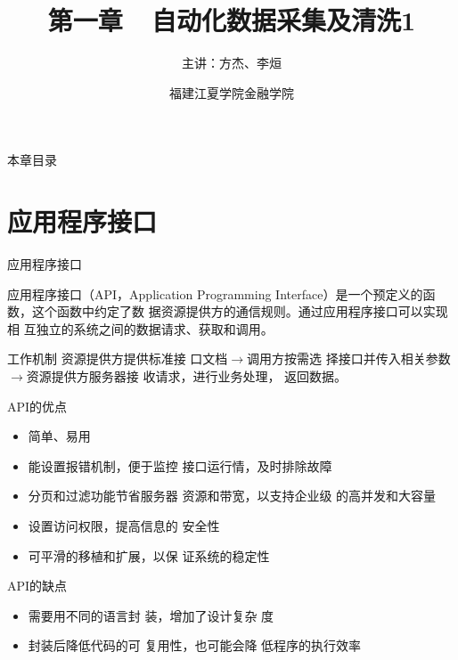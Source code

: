 \documentclass[t]{beamer}
\begin{document}
\fontsize{11}{18}\selectfont


\CTEXindent


\title{第一章~~自动化数据采集及清洗1}

\author{主讲：方杰、李烜}
\date{福建江夏学院金融学院}

\maketitle

\begin{frame}{本章目录}
      \tableofcontents  
\end{frame}


\section{应用程序接口}

\begin{frame}{应用程序接口}
 
应用程序接口（API，Application Programming Interface）是一个{\color{red}预定义的函数}，这个函数中约定了数
据资源提供方的通信规则。通过应用程序接口可以实现相
互独立的系统之间的数据请求、获取和调用。

\begin{block}{工作机制}
    资源提供方提供标准接
口文档$\longrightarrow$调用方按需选
择接口并传入相关参数
$\longrightarrow $资源提供方服务器接
收请求，进行业务处理，
返回数据。
\end{block}


\end{frame}


\begin{frame}{API的优点}
\begin{itemize}
    \item 简单、易用
    \item 能设置报错机制，便于监控
    接口运行情，及时排除故障
    \item 分页和过滤功能节省服务器
    资源和带宽，以支持企业级
    的高并发和大容量
    \item 设置访问权限，提高信息的
    安全性
    \item 可平滑的移植和扩展，以保
    证系统的稳定性
\end{itemize}
\end{frame}




\begin{frame}{API的缺点}
\begin{itemize}
    \item 需要用不同的语言封
    装，增加了设计复杂
    度
    \item 封装后降低代码的可
    复用性，也可能会降
    低程序的执行效率
\end{itemize}


\end{frame}
\end{document}
